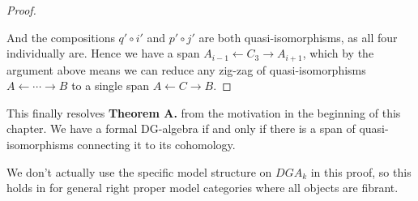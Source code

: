 \begin{proof}
\begin{center}
\end{center}

And the compositions $q'\circ i'$ and $p'\circ j'$ are both quasi-isomorphisms, as all four individually are. Hence we have a span $A_{i-1}\longleftarrow C_3 \longrightarrow A_{i+1}$, which by the argument above means we can reduce any zig-zag of quasi-isomorphisms $A\leftarrow \cdots \rightarrow B$ to a single span $A\leftarrow C\rightarrow B$. 
\end{proof}

This finally resolves \textbf{Theorem A.} from the motivation in the beginning of this chapter. We have a formal DG-algebra if and only if there is a span of quasi-isomorphisms connecting it to its cohomology.  


We don't actually use the specific model structure on $DGA_k$ in this proof, so this holds in for general right proper model categories where all objects are fibrant. 

